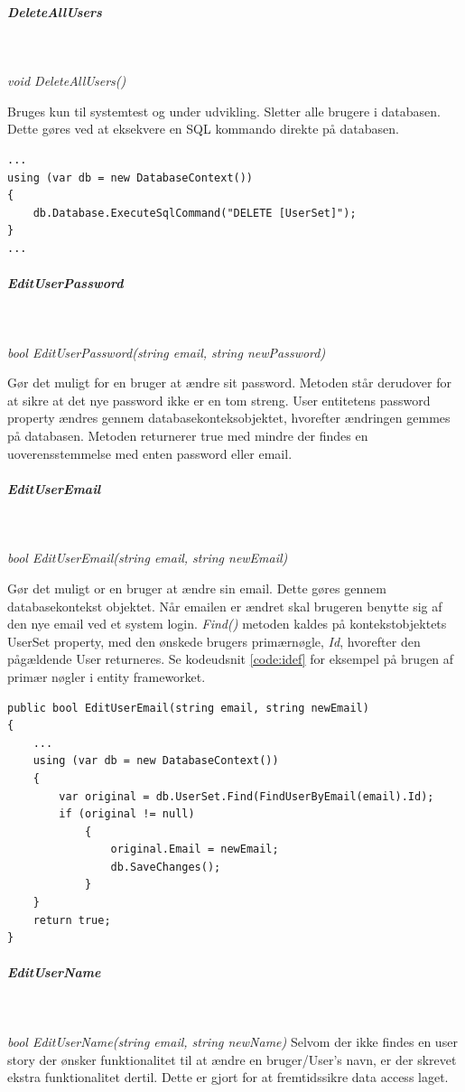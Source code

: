 \subparagraph{DeleteAllUsers}\

\textit{void DeleteAllUsers()}

Bruges kun til systemtest og under udvikling.
Sletter alle brugere i databasen. Dette gøres ved at eksekvere en SQL kommando direkte på databasen. 

\begin{lstlisting}[caption=SQL injection på databasen ved sletning af brugere, label=sqlDeleteUsers]
...
using (var db = new DatabaseContext())
{
	db.Database.ExecuteSqlCommand("DELETE [UserSet]");
}
...	
\end{lstlisting}

\subparagraph{EditUserPassword}\

\textit{bool EditUserPassword(string email, string newPassword)}

Gør det muligt for en bruger at ændre sit password. Metoden står derudover for at sikre at det nye password ikke er en tom streng. User entitetens password property ændres gennem databasekonteksobjektet, hvorefter ændringen gemmes på databasen.
Metoden returnerer true med mindre der findes en uoverensstemmelse med enten password eller email.

\subparagraph{EditUserEmail}\

\textit{bool EditUserEmail(string email, string newEmail)}

Gør det muligt or en bruger at ændre sin email. Dette gøres gennem databasekontekst objektet. Når emailen er ændret skal brugeren benytte sig af den nye email ved et system login. \textit{Find()} metoden kaldes på kontekstobjektets UserSet property, med den ønskede brugers primærnøgle, \textit{Id}, hvorefter den pågældende User returneres. Se kodeudsnit \ref{code:idef} for eksempel på brugen af primær nøgler i entity frameworket.

\begin{lstlisting}[caption=EditUserEmail - brug af primær nøgler i Entity Framework,label=code:idef]
public bool EditUserEmail(string email, string newEmail)
{
	...
	using (var db = new DatabaseContext())
	{
		var original = db.UserSet.Find(FindUserByEmail(email).Id);
		if (original != null)
			{
				original.Email = newEmail;
				db.SaveChanges();
			}
	}
	return true;
}

\end{lstlisting}

\subparagraph{EditUserName}\

\textit{bool EditUserName(string email, string newName)}
Selvom der ikke findes en user story der ønsker funktionalitet til at ændre en bruger/User's navn, er der skrevet ekstra funktionalitet dertil. Dette er gjort for at fremtidssikre data access laget.

